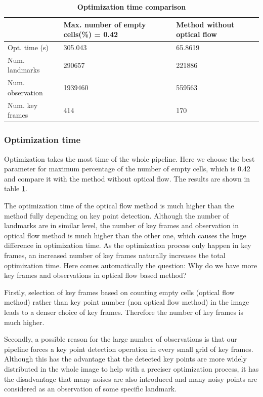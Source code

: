 \documentclass{easychair}
\begin{document}
\begin{table}[b]
	\centering
	\caption{\textbf{Optimization time comparison}}
	\label{tab:optimization}
	\begin{tabular}{lll}
		& Max. number of empty cells(\%) = 0.42 & Method without optical flow   \\ \hline
		Opt. time (s)  & 305.043 & 65.8619\\
		Num. landmarks &290657 &221886\\
		Num. observation & 1939460 & 559563 \\        
		Num. key frames & 414 & 170                 
	\end{tabular}
\end{table}

\subsubsection{Optimization time}
Optimization takes the most time of the whole pipeline. Here we choose the best parameter for maximum percentage of the number of empty cells, which is 0.42 and compare it with the method without optical flow. The results are shown in table \ref{tab:optimization}.

The optimization time of the optical flow method is much higher than the method fully depending on key point detection. Although the number of landmarks are in similar level, the number of key frames and observation in optical flow method is much higher than the other one, which causes the huge difference in optimization time. As the optimization process only happen in key frames, an increased number of key frames naturally increases the total optimization time. Here comes automatically the question: Why do we have more key frames and observations in optical flow based method?

Firstly, selection of key frames based on counting empty cells (optical flow method) rather than key point number (non optical flow method) in the image leads to a denser choice of key frames. Therefore the number of key frames is much higher.

Secondly, a possible reason for the large number of observations is that our pipeline forces a key point detection operation in every small grid of key frames. Although this has the advantage that the detected key points are more widely distributed in the whole image to help with a preciser optimization process, it has the disadvantage that many noises are also introduced and many noisy points are considered as an observation of some specific landmark.  
\end{document}
